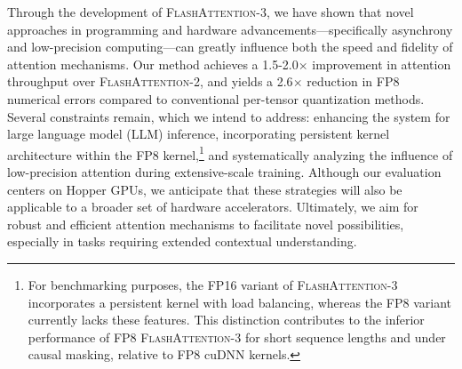 Through the development of \textsc{FlashAttention-3}, we have shown that novel approaches in programming and hardware advancements—specifically asynchrony and low-precision computing—can greatly influence both the speed and fidelity of attention mechanisms. Our method achieves a 1.5-2.0$\times$ improvement in attention throughput over \textsc{FlashAttention-2}, and yields a 2.6$\times$ reduction in FP8 numerical errors compared to conventional per-tensor quantization methods. Several constraints remain, which we intend to address: enhancing the system for large language model (LLM) inference, incorporating persistent kernel architecture within the FP8 kernel,\footnote{For benchmarking purposes, the FP16 variant of \textsc{FlashAttention-3} incorporates a persistent kernel with load balancing, whereas the FP8 variant currently lacks these features. This distinction contributes to the inferior performance of FP8 \textsc{FlashAttention-3} for short sequence lengths and under causal masking, relative to FP8 cuDNN kernels.} and systematically analyzing the influence of low-precision attention during extensive-scale training. Although our evaluation centers on Hopper GPUs, we anticipate that these strategies will also be applicable to a broader set of hardware accelerators. Ultimately, we aim for robust and efficient attention mechanisms to facilitate novel possibilities, especially in tasks requiring extended contextual understanding.

